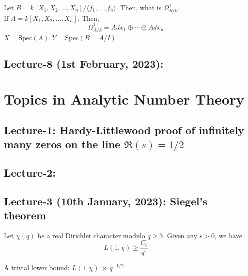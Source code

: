 \documentclass[oneside, 12pt, ]{scrbook}
\newcommand{\spec}{\mathrm{Spec}}
\theoremstyle{theorem}
\begin{document}
\begin{example}
Let $B = k[X_{1},X_{2}, \hdots , X_{n}]/\langle f_{1}, \hdots , f_{n} \rangle$. Then, what is $\Omega_{B/k}^{1}$. \\

If $A = k[X_{1}, X_{2}, \hdots , X_{n}]$. Then, $$\Omega_{A/k}^{1} = Adx_{1} \oplus \cdots \oplus Adx_{n}$$ 
$X= \spec(A), Y = \spec(B = A/I)$
\end{example}


\chapter{Lecture-8 (1st February, 2023):}












\part{Topics in Analytic Number Theory}

\chapter{Lecture-1: Hardy-Littlewood proof of infinitely many zeros on the line $\mathfrak{R}(s) = 1/2$}

\chapter{Lecture-2: }

\chapter{Lecture-3 (10th January, 2023): Siegel's theorem }

\begin{theorem}[Siegel]
Let $\chi(q)$ be a real Dirichlet character modulo $q\geq 3$. Given any $\epsilon >0$, we have $$L(1, \chi) \geq \frac{C_{\epsilon}}{q^{\epsilon}}$$
\end{theorem}

A trivial lower bound: $L(1, \chi) \gg q^{-1/2}$
\end{document}
